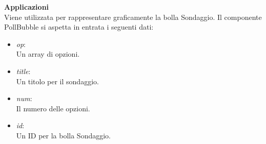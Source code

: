 \textbf{Applicazioni}\\
Viene utilizzata per rappresentare graficamente la bolla Sondaggio.
Il componente PollBubble si aspetta in entrata i seguenti dati: \\
\begin{itemize}
\item \textit{op}:
\\
Un array di opzioni.
\item \textit{title}:
\\
Un titolo per il sondaggio.
\item \textit{num}:
\\
Il numero delle opzioni.
\item \textit{id}:
\\
Un ID per la bolla Sondaggio.
\end{itemize} 


\clearpage

